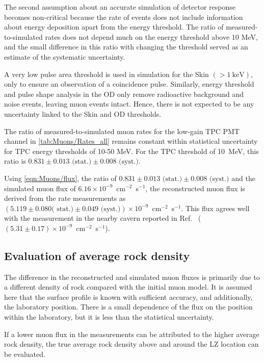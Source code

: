 The second assumption about an accurate simulation of detector response becomes non-critical because the rate of events does not include information about energy deposition apart from the energy threshold. The ratio of measured-to-simulated rates does not depend much on the energy threshold above 10 MeV, and the small difference in this ratio with changing the threshold served as an estimate of the systematic uncertainty. 

A very low pulse area threshold is used in simulation for the Skin $(>1~\text{keV})$, only to ensure an observation of a coincidence pulse. Similarly, energy threshold and pulse shape analysis in the OD only remove radioactive background and noise events, leaving muon events intact. Hence, there is not expected to be any uncertainty linked to the Skin and OD thresholds.

The ratio of measured-to-simulated muon rates for the low-gain TPC PMT channel in \autoref{tab:Muons/Rates_all} remains constant within statistical uncertainty for TPC energy thresholds of 10-50 MeV. For the TPC threshold of 10~MeV, this ratio is $0.831 \pm 0.013 \textrm{ (stat.)} \pm 0.008 \textrm{ (syst.)}$. 


Using \autoref{eqn:Muons/flux}, the ratio of $0.831 \pm 0.013 \text{ (stat.)} \pm 0.008 \text{ (syst.)}$ and the simulated muon flux of $6.16 \times10^{-9}$~cm$^{-2}$~s$^{-1}$, the reconstructed muon flux is derived from the rate measurements as $(5.119 \pm 0.080 \textrm{( stat.)} \pm 0.049 \textrm{ (syst.)})\times10^{-9}$~cm$^{-2}$~s$^{-1}$. This flux agrees well with the measurement in the nearby cavern reported in Ref.~\cite{majorana} ($(5.31 \pm 0.17)\times10^{-9}$~cm$^{-2}$~s$^{-1}$).

\subsection{Evaluation of average rock density}\label{sec:Muons/RockDensity}
The difference in the reconstructed and simulated muon fluxes is primarily due to a different density of rock compared with the initial muon model. It is assumed here that the surface profile is known with sufficient accuracy, and additionally, the laboratory position. There is a small dependence of the flux on the position within the laboratory, but it is less than the statistical uncertainty. 

If a lower muon flux in the measurements can be attributed to the higher average rock density, the true average rock density above and around the LZ location can be evaluated. 

